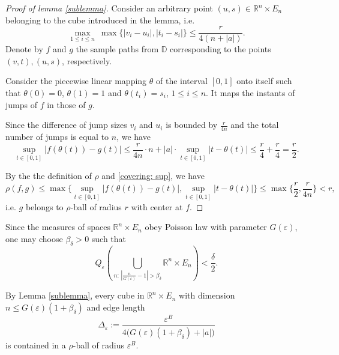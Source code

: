 \documentclass[12pt]{article}
\newcommand\D{\mathbb D}
\let\de\delta
\let\ep\varepsilon
\newcommand\ro{\rho}
\newcommand{\R}{\mathbb{R}}
\let\le\leqslant
\theoremstyle{definition}
\begin{document}
\begin{proof}[Proof of lemma \ref{sublemma}]
Consider an arbitrary point $(u,s)\in \R^n\times E_n$ belonging to the cube introduced in the lemma,
i.e.
\[
    \max_{1\le i\le n} \ \max\{ |v_i-u_i|, |t_i-s_i| \} \le \frac{r}{4(n + |a|)}.
\]
Denote by $f$ and $g$ the sample paths from $\D$ corresponding to the points $(v,t), (u,s)$, respectively.
            
Consider the piecewise linear mapping $\theta$ of the interval $[0,1]$ onto itself such that 
$\theta(0) = 0$, $\theta(1) = 1$ and $\theta(t_i) = s_i$, $1\le i\le n$. 
It maps the instants of jumps of $f$ in those of $g$. 

Since the difference of jump sizes  $v_i$ and $u_i$ is bounded by $\frac{r}{4n}$
and the total number of jumps is equal to $n$, we have 
\begin{equation}\label{covering: sup}
                \sup_{t\in[0, 1]} |f(\theta(t)) - g(t)| \le \frac{r}{4n} \cdot n 
                 + |a|\cdot\sup_{t\in[0,1]}|t - \theta(t)| \le \frac{r}{4} + \frac{r}{4} = \frac{r}{2}.    
\end{equation}
            
By the the definition of $\ro$ and \eqref{covering: sup}, we have  
\[
   \ro(f, g) \le \max\big\{\sup_{t\in[0, 1]} |f(\theta(t)) - g(t)|, \sup_{t\in[0,1]}|t - \theta(t)|\big\} 
   \le \max\big\{\frac{r}{2}, \frac{r}{4n}\big\} < r,
\]
i.e. $g$ belongs to $\ro$-ball of radius $r$ with center at $f$.
\end{proof}
    
Since the measures of spaces $\R^n\times E_n$ obey Poisson law with parameter $G(\ep)$, 
one may choose $\beta_\delta >0$ such that 
\begin{equation}\label{covering: threshold}
      Q_\ep \left(
          \bigcup_{ n:\, |\frac{n}{G(\ep)} - 1|>\beta_\delta} \R^n\times E_n
          \right) 
          < \frac{\de}{2}.
\end{equation}
    
By Lemma \ref{sublemma}, every cube in  $\R^n\times E_n$ with dimension
$n \le G(\ep)(1 + \beta_\de)$ and edge length
\[
    \Delta_\ep := \frac{\ep^B}{4\big(G(\ep)(1 + \beta_\de) + |a|\big)}
\]
is contained in a $\ro$-ball of radius $\ep^B$. 
\end{document}
